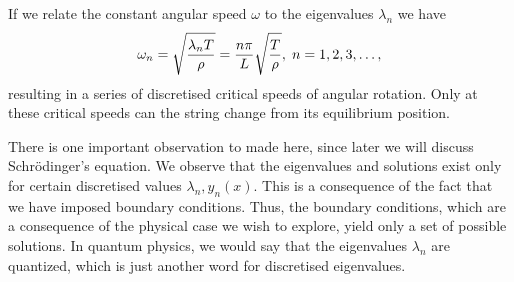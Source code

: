If we relate the constant angular speed $\omega$ to the eigenvalues $\lambda_n$ we have
\[
   \omega_n=\sqrt{\frac{\lambda_nT}{\rho}}=\frac{n\pi}{L}\sqrt{\frac{T}{\rho}}, \hspace{0.1cm} n=1,2,3,\dots,
\]
resulting in a series of discretised critical speeds of angular rotation. Only at these critical
speeds can the string change from its equilibrium position. 

There is one important observation to made here, since later we will discuss Schr\"odinger's equation.
We observe that the eigenvalues and solutions exist only for certain discretised values 
$\lambda_n,y_n(x)$. This is a consequence of the fact that we have imposed boundary conditions.
Thus, the boundary conditions, which are a consequence of the physical case we wish to explore,
yield only a set of possible solutions. In quantum physics, we would say that the eigenvalues
$\lambda_n$ are quantized, which is just another word for discretised eigenvalues. 

